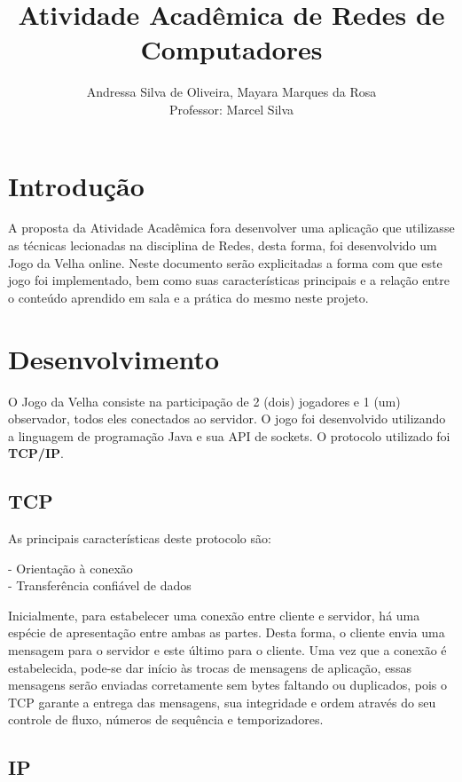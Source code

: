\documentclass[14pt]{article}
\title{Atividade Acadêmica de Redes de Computadores}
\author{Andressa Silva de Oliveira\inst{1}, Mayara Marques da Rosa\inst{2} \\ Professor: Marcel Silva}
\begin{document}
 
\maketitle


\section{Introdução}
A proposta da Atividade Acadêmica fora desenvolver uma aplicação que utilizasse as técnicas lecionadas na disciplina de Redes, desta forma, foi desenvolvido um Jogo da Velha online. Neste documento serão explicitadas a forma com que este jogo foi implementado, bem como suas características principais e a relação entre o conteúdo aprendido em sala e a prática do mesmo neste projeto.
 
\section{Desenvolvimento}

O Jogo da Velha consiste na participação de 2 (dois) jogadores e 1 (um) observador, todos eles conectados ao servidor. O jogo foi desenvolvido utilizando a linguagem de programação Java e sua API de sockets. O protocolo utilizado foi \textbf{TCP/IP}.

\subsection{TCP}

As principais características deste protocolo são:

\hspace*{0.7 cm} - Orientação à conexão\\
\hspace*{2 cm} - Transferência confiável de dados

Inicialmente, para estabelecer uma conexão entre cliente e servidor, há uma espécie de apresentação entre ambas as partes. Desta forma, o cliente envia uma mensagem para o servidor e este último para o cliente.
Uma vez que a conexão é estabelecida, pode-se dar início às trocas de mensagens de aplicação, essas mensagens serão enviadas corretamente sem bytes faltando ou duplicados, pois o TCP garante a entrega das mensagens, sua integridade e ordem através do seu controle de fluxo, números de sequência e temporizadores. \cite{kurose}

\subsection{IP}
\end{document}
